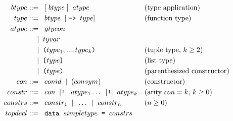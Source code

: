 \begin{align*}
	btype   & ::=\;\; [\; btype \;] \;\; atype                                           &   & \text{(type application)}            \\
	type    & ::=\;\; btype \;\; [\; \texttt{->} \;\; type ]                                &   & \text{(function type)}               \\
	atype   & ::=\;\; gtycon                                                             &   &                                      \\
	        & \;\;\; \;\; | \;\; tyvar                                                            &   &                                      \\
	        & \;\;\; \;\; | \;\; \texttt{(}type_1, ..., type_k\texttt{)}                                &   & \text{(tuple type, $k\geq 2$)}       \\
	        & \;\;\; \;\; | \;\; \texttt{[} type \texttt{]}                                             &   & \text{(list type)}                   \\
	        & \;\;\; \;\; | \;\; \texttt{(} type \texttt{)}                                             &   & \text{(parenthesized constructor)}   \\
	con     & ::=\;\; conid \;\; | \;\; ( consym )                                              &   & \text{(constructor)}                 \\
	constr  & ::=\;\; con \;\; [\texttt{!}] \;\; atype_1 \ldots \;\; [\texttt{!}] \;\; atype_k &   & \text{(arity $con = k$, $k \geq 0$)} \\
	constrs & ::=\;\; constr_1 \;\; | \;\; \ldots \;\; | \;\; constr_n                                 &   & \text{($n \geq 0$)}                  \\
	topdecl & ::=\;\; \texttt{data} \;\; simpletype \;\; \texttt{=} \;\; constrs               &   &                                      
\end{align*}

